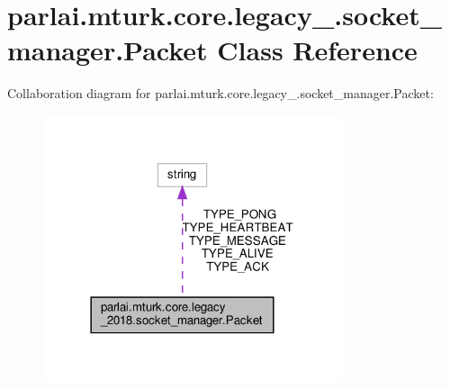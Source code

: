 \hypertarget{classparlai_1_1mturk_1_1core_1_1legacy__2018_1_1socket__manager_1_1Packet}{}\section{parlai.\+mturk.\+core.\+legacy\+\_.\+socket\+\_\+manager.\+Packet Class Reference}
\label{classparlai_1_1mturk_1_1core_1_1legacy__2018_1_1socket__manager_1_1Packet}


Collaboration diagram for parlai.\+mturk.\+core.\+legacy\+\_.\+socket\+\_\+manager.\+Packet\+:
\nopagebreak
\begin{figure}[H]
\begin{center}
\leavevmode
\includegraphics[width=249pt]{classparlai_1_1mturk_1_1core_1_1legacy__2018_1_1socket__manager_1_1Packet__coll__graph}
\end{center}
\end{figure}
